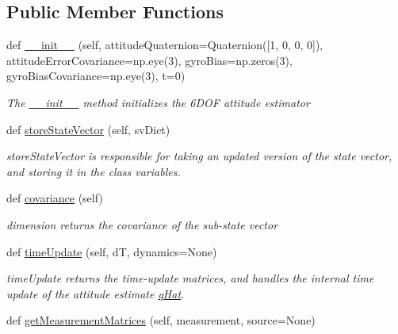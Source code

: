 \subsection*{Public Member Functions}
\begin{DoxyCompactItemize}
\item 
def \hyperlink{classAttitudeSubstate_1_1AttitudeState6DOF_a337e9fa07d0211f86b359e5d9deee1b8}{\+\_\+\+\_\+init\+\_\+\+\_\+} (self, attitude\+Quaternion=Quaternion(\mbox{[}1, 0, 0, 0\mbox{]}), attitude\+Error\+Covariance=np.\+eye(3), gyro\+Bias=np.\+zeros(3), gyro\+Bias\+Covariance=np.\+eye(3), t=0)
\begin{DoxyCompactList}\small\item\em The \hyperlink{classAttitudeSubstate_1_1AttitudeState6DOF_a337e9fa07d0211f86b359e5d9deee1b8}{\+\_\+\+\_\+init\+\_\+\+\_\+} method initializes the 6\+D\+OF attitude estimator \end{DoxyCompactList}\item 
def \hyperlink{classAttitudeSubstate_1_1AttitudeState6DOF_a8ed0ab1ebe989bd7d54c12889c7bf2a9}{store\+State\+Vector} (self, sv\+Dict)
\begin{DoxyCompactList}\small\item\em store\+State\+Vector is responsible for taking an updated version of the state vector, and storing it in the class variables. \end{DoxyCompactList}\item 
def \hyperlink{classAttitudeSubstate_1_1AttitudeState6DOF_a44691ece9ee2a36d3c11f12e72004e41}{covariance} (self)
\begin{DoxyCompactList}\small\item\em dimension returns the covariance of the sub-\/state vector \end{DoxyCompactList}\item 
def \hyperlink{classAttitudeSubstate_1_1AttitudeState6DOF_a9b27c2b6d9e51256918edd8505df0bd7}{time\+Update} (self, dT, dynamics=None)
\begin{DoxyCompactList}\small\item\em time\+Update returns the time-\/update matrices, and handles the internal time update of the attitude estimate \hyperlink{classAttitudeSubstate_1_1AttitudeState6DOF_a36a58a47280151dd544762d9a1d5c35d}{q\+Hat}. \end{DoxyCompactList}\item 
def \hyperlink{classAttitudeSubstate_1_1AttitudeState6DOF_a81f4c417a0f6f0ecf0478fc885bbd79f}{get\+Measurement\+Matrices} (self, measurement, source=None)

\end{DoxyCompactItemize}
